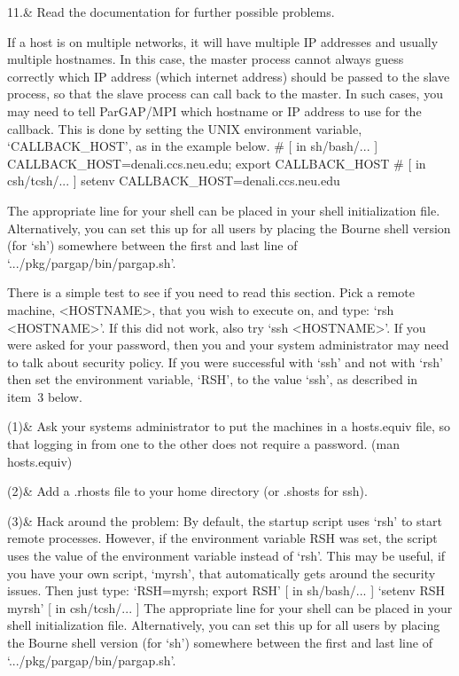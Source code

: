 11.& Read the documentation for further possible problems.
\enditems


If a host is on multiple networks, it will have multiple IP addresses
and usually multiple hostnames.  In this case, the master process cannot
always guess correctly which IP address (which internet address) should be
passed to the slave process, so that the slave process can call back to the
master.  In such cases, you may need to tell ParGAP/MPI which hostname
or IP address to use for the callback.  This is done by setting the
UNIX environment variable, `CALLBACK_HOST', as in the example below.
\begintt
# [ in sh/bash/... ]
CALLBACK_HOST=denali.ccs.neu.edu; export CALLBACK_HOST
# [ in csh/tcsh/... ]
setenv CALLBACK_HOST=denali.ccs.neu.edu
\endtt

The appropriate line for your shell can be placed in your shell initialization
file.  Alternatively, you can set this up for all users by placing
the Bourne shell version (for `sh') somewhere between the first and last line
of `.../pkg/pargap/bin/pargap.sh'.


There is a simple test to see if you need to read this section.
Pick a remote machine, <HOSTNAME>, that you wish to execute on,
and type:  `rsh <HOSTNAME>'.  If this did not work, also try
`ssh <HOSTNAME>'.  If you were asked for your password, then you and
your system administrator may need to talk about security policy.
If you were successful with `ssh' and not with `rsh' then set
the environment variable, `RSH', to the value `ssh', as described in
item~3 below.

\beginitems
     (1)& Ask your systems administrator to put the machines in a hosts.equiv
         file, so that logging in from one to the other does not require
         a password.  (man hosts.equiv)

     (2)& Add a .rhosts file to your home directory (or .shosts for ssh).

     (3)& Hack around the problem:
         By default, the startup script uses `rsh' to start remote
         processes.  However, if the environment variable RSH was set,
         the script uses the value of the environment variable instead of `rsh'.
         This may be useful, if you have your own script, `myrsh', that
         automatically gets around the security issues.  Then just type:
         \hfil\break
         `RSH=myrsh; export RSH'   [ in sh/bash/... ]
         \hfil\break
         `setenv RSH myrsh'        [ in csh/tcsh/... ]
         \hfil\break
         The appropriate line for your shell can be placed in your shell
         initialization file.  Alternatively, you can set this up for all
         users by placing the Bourne shell version (for `sh') somewhere
         between the first and last line of
         `.../pkg/pargap/bin/pargap.sh'.


